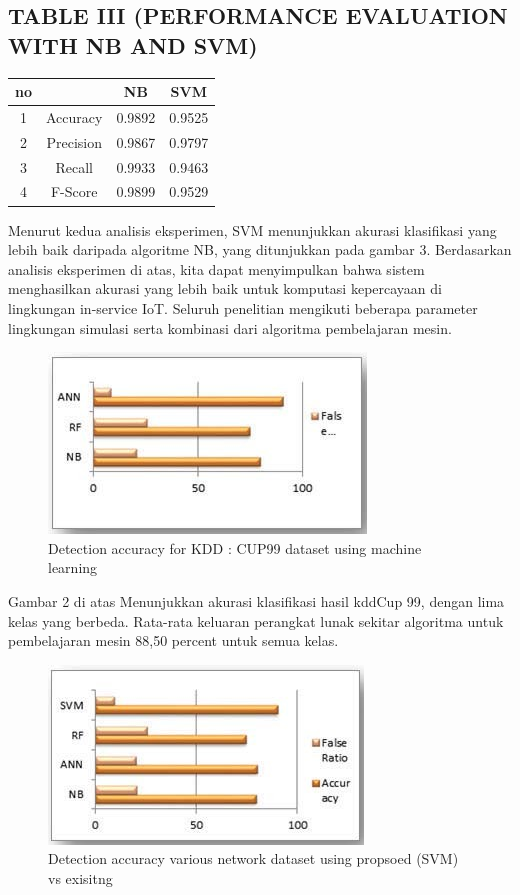 \documentclass[conference]{IEEEtran}
\begin{document}
\subsection{TABLE III (PERFORMANCE EVALUATION WITH NB AND SVM)}

\begin{table}[H]
\begin{tabular}{|c|c|c|c|}
\hline
no &  & NB & SVM\\
\hline
1   & Accuracy & 0.9892 & 0.9525\\
\hline
2   & Precision & 0.9867 & 0.9797\\
\hline
3   & Recall & 0.9933 & 0.9463 \\
\hline
4   & F-Score& 0.9899 & 0.9529 \\
\hline
\end{tabular}
\end{table}

Menurut kedua analisis eksperimen, SVM menunjukkan akurasi klasifikasi yang lebih baik daripada algoritme NB, yang ditunjukkan pada gambar 3. Berdasarkan analisis eksperimen di atas, kita dapat menyimpulkan bahwa sistem menghasilkan akurasi yang lebih baik untuk komputasi kepercayaan di lingkungan in-service IoT. Seluruh penelitian mengikuti beberapa parameter lingkungan simulasi serta kombinasi dari algoritma pembelajaran mesin.

\begin{figure}
\centering
\includegraphics[width=.3\textwidth]{Gambar/pct2.jpg}
\caption{Detection accuracy for KDD : CUP99 dataset using machine learning}
\end{figure}

Gambar 2 di atas Menunjukkan akurasi klasifikasi hasil kddCup 99, dengan lima kelas yang berbeda. Rata-rata keluaran perangkat lunak sekitar algoritma untuk pembelajaran mesin 88,50 percent untuk semua kelas.

\begin{figure}
\centering
\includegraphics[width=.3\textwidth]{Gambar/pct3.jpg}
\caption{Detection accuracy various network dataset using propsoed (SVM) vs exisitng}
\end{figure}
\end{document}
